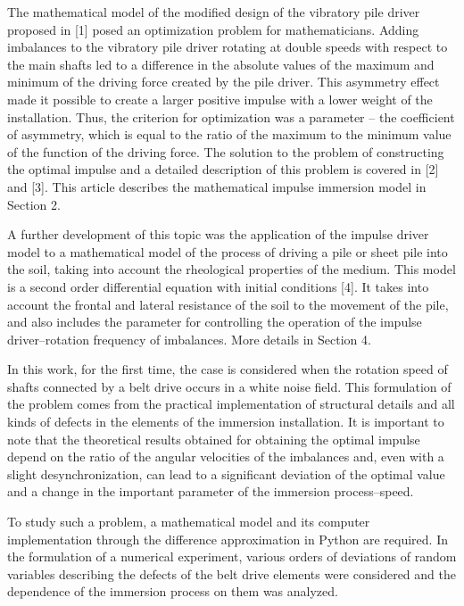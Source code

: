 \documentclass[
11pt,%
tightenlines,%
twoside,%
onecolumn,%
nofloats,%
nobibnotes,%
nofootinbib,%
superscriptaddress,%
noshowpacs,%
centertags]%
{revtex4}
\begin{document}
The mathematical model of the modified design of the vibratory pile
driver proposed in [1] posed an optimization problem for
mathematicians. Adding imbalances to the vibratory pile driver
rotating at double speeds with respect to the main shafts led to a
difference in the absolute values of the maximum and minimum of the
driving force created by the pile driver. This asymmetry effect made
it possible to create a larger positive impulse with a lower weight
of the installation. Thus, the criterion for optimization was a
parameter -- the coefficient of asymmetry, which is equal to the
ratio of the maximum to the minimum value of the function of the
driving force. The solution to the problem of constructing the
optimal impulse and a detailed description of this problem is
covered in [2] and [3]. This article describes the mathematical
impulse immersion model in Section 2.

A further development of this topic  was the application of the
impulse driver model to a mathematical model of the process of
driving a pile or sheet pile into the soil, taking into account the
rheological properties of the medium. This model is a second order
differential equation with initial conditions [4]. It takes into
account the frontal and lateral resistance of the soil to the
movement of the pile, and also includes the parameter for
controlling the operation of the impulse driver--rotation frequency
of imbalances. More details in Section 4.

In this work, for the first time, the case  is considered when the
rotation speed of shafts connected by a belt drive occurs in a white
noise field. This formulation of the problem comes from the
practical implementation of structural details and all kinds of
defects in the elements of the immersion installation. It is
important to note that the theoretical results obtained for
obtaining the optimal impulse depend on the ratio of the angular
velocities of the imbalances and, even with a slight
desynchronization, can lead to a significant deviation of the
optimal value and a change in the important parameter of the
immersion process--speed.

To study such a problem, a mathematical model  and its computer
implementation through the difference approximation in Python are
required. In the formulation of a numerical experiment, various
orders of deviations of random variables describing the defects of
the belt drive elements were considered and the dependence of the
immersion process on them was analyzed.
\end{document}

